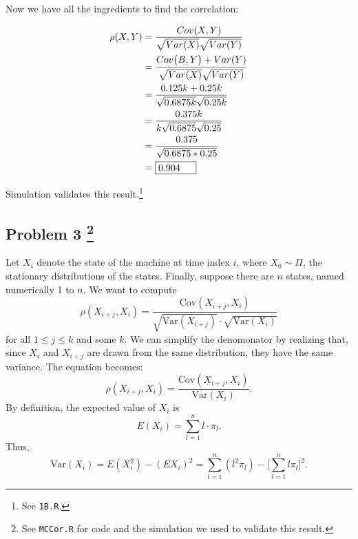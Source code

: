 \documentclass[letter]{article}
\newcounter{foot}
\begin{document}
Now we have all the ingredients to find the correlation:


\begin{equation*}
	\begin{aligned}
	\rho(X,Y) &= \frac{Cov(X, Y)}{\sqrt{Var(X)}\sqrt{Var(Y)}} \\
	       &= \frac{Cov\big(B,Y\big) + Var(Y)}{\sqrt{Var(X)}\sqrt{Var(Y)}} \\
	       &= \frac{0.125k + 0.25k}{\sqrt{0.6875k}\sqrt{0.25k}} \\
	       &= \frac{0.375k}{k\sqrt{0.6875}\sqrt{0.25}} \\
	       &= \frac{0.375}{\sqrt{0.6875*0.25}} \\
	       &= {\fbox {\parbox{0.5in}{0.904}}}\\
	\end{aligned}
\end{equation*}

Simulation validates this result.\footnote{See \texttt{1B.R}.}

\subsection*{Problem 3
\footnote{See \texttt{MCCor.R} for code and the simulation we used to validate this result.}
} 
Let $X_i$ denote the state of the machine at time index $i$, where $X_0  
\sim \Pi$, the stationary distributions of the states. Finally, suppose there are $n$ states, 
named numerically 1 to $n$. We want to compute
$$\rho(X_{i+j}, X_i) = \frac{\text{Cov}(X_{i+j}, X_i)}
                 {\sqrt{\text{Var}(X_{i+j})} \cdot \sqrt{\text{Var}(X_i)}} $$ 
for all $1 \le j \le k$ and some $k$. We can simplify the denomonator by realizing 
that, since $X_i$ and $X_{i+j}$ are drawn from the same distribution, they have
the same variance. The equation becomes: 
$$\rho(X_{i+j}, X_i) = \frac{\text{Cov}(X_{i+j}, X_i)}
                 {\text{Var}(X_{i})}. $$
By definition, the expected value of $X_i$ is
$$ E(X_i) = \sum_{l=1}^n{l\cdot\pi_l}. $$ 
Thus, 
$$ \text{Var}(X_i) = E(X_i^2) - (EX_i)^2 =
  \sum_{l=1}^n{(l^2\pi_l)} - \Big[ \sum_{l=1}^n{l \pi_l} \Big]^2.$$ 
\end{document}
